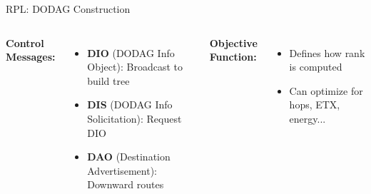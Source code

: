 \documentclass[aspectratio=169,11pt]{beamer}
\begin{document}
\begin{frame}{RPL: DODAG Construction}
\begin{columns}
        \vspace{0.2cm}
        \textbf{Control Messages:}
        \begin{itemize}
            \item \textbf{DIO} (DODAG Info Object): Broadcast to build tree
            \item \textbf{DIS} (DODAG Info Solicitation): Request DIO
            \item \textbf{DAO} (Destination Advertisement): Downward routes
        \end{itemize}
        
        \vspace{0.2cm}
        \textbf{Objective Function:}
        \begin{itemize}
            \item Defines how rank is computed
            \item Can optimize for hops, ETX, energy...
        \end{itemize}
    \end{columns}
\end{frame}
\end{document}
